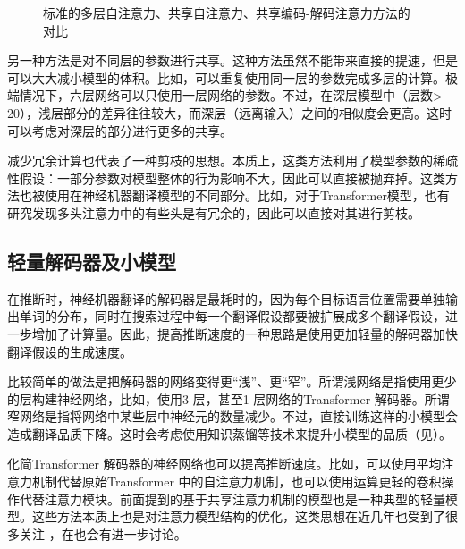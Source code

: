 \begin{figure}[htp]
\centering

\caption{标准的多层自注意力、共享自注意力、共享编码-解码注意力方法的对比}
\label{fig:14-6}
\end{figure}

\parinterval 另一种方法是对不同层的参数进行共享。这种方法虽然不能带来直接的提速，但是可以大大减小模型的体积。比如，可以重复使用同一层的参数完成多层的计算。极端情况下，六层网络可以只使用一层网络的参数。不过，在深层模型中（层数> 20），浅层部分的差异往往较大，而深层（远离输入）之间的相似度会更高。这时可以考虑对深层的部分进行更多的共享。

\parinterval 减少冗余计算也代表了一种剪枝的思想。本质上，这类方法利用了模型参数的稀疏性假设：一部分参数对模型整体的行为影响不大，因此可以直接被抛弃掉。这类方法也被使用在神经机器翻译模型的不同部分。比如，对于Transformer模型，也有研究发现多头注意力中的有些头是有冗余的，因此可以直接对其进行剪枝。


\subsection{轻量解码器及小模型}

\parinterval 在推断时，神经机器翻译的解码器是最耗时的，因为每个目标语言位置需要单独输出单词的分布，同时在搜索过程中每一个翻译假设都要被扩展成多个翻译假设，进一步增加了计算量。因此，提高推断速度的一种思路是使用更加轻量的解码器加快翻译假设的生成速度。

\parinterval 比较简单的做法是把解码器的网络变得更“浅”、更“窄”。所谓浅网络是指使用更少的层构建神经网络，比如，使用3 层，甚至1 层网络的Transformer 解码器。所谓窄网络是指将网络中某些层中神经元的数量减少。不过，直接训练这样的小模型会造成翻译品质下降。这时会考虑使用知识蒸馏等技术来提升小模型的品质（见{\chapterthirteen}）。

\parinterval 化简Transformer 解码器的神经网络也可以提高推断速度。比如，可以使用平均注意力机制代替原始Transformer 中的自注意力机制，也可以使用运算更轻的卷积操作代替注意力模块。前面提到的基于共享注意力机制的模型也是一种典型的轻量模型。这些方法本质上也是对注意力模型结构的优化，这类思想在近几年也受到了很多关注 ，在{\chapterfifteen}也会有进一步讨论。

